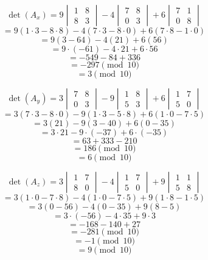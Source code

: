 \documentclass[a4paper]{exam}
\begin{document}
\begin{questions}
\begin{solution}
\begin{parts}
                \[    \det(A_x) = 9 \begin{vmatrix} 1 & 8 \\ 8 & 3 \end{vmatrix} - 4 \begin{vmatrix} 7 & 8 \\ 0 & 3 \end{vmatrix} + 6 \begin{vmatrix} 7 & 1 \\ 0 & 8 \end{vmatrix}\]
                \[    = 9 (1 \cdot 3 - 8 \cdot 8) - 4 (7 \cdot 3 - 8 \cdot 0) + 6 (7 \cdot 8 - 1 \cdot 0)\]
                \[    = 9 (3 - 64) - 4 (21) + 6 (56)\]
                \[    = 9 \cdot (-61) - 4 \cdot 21 + 6 \cdot 56\]
                \[    = -549 - 84 + 336\]
                \[    = -297 \pmod{10}\]
                \[    = 3 \pmod{10}\]

                \[    \det(A_y) = 3 \begin{vmatrix} 7 & 8 \\ 0 & 3 \end{vmatrix} - 9 \begin{vmatrix} 1 & 8 \\ 5 & 3 \end{vmatrix} + 6 \begin{vmatrix} 1 & 7 \\ 5 & 0 \end{vmatrix}\]
                \[    = 3 (7 \cdot 3 - 8 \cdot 0) - 9 (1 \cdot 3 - 5 \cdot 8) + 6 (1 \cdot 0 - 7 \cdot 5)\]
                \[    = 3 (21) - 9 (3 - 40) + 6 (0 - 35)\]
                \[    = 3 \cdot 21 - 9 \cdot (-37) + 6 \cdot (-35)\]
                \[    = 63 + 333 - 210\]
                \[    = 186 \pmod{10}\]
                \[    = 6 \pmod{10}\]

                \[    \det(A_z) = 3 \begin{vmatrix} 1 & 7 \\ 8 & 0 \end{vmatrix} - 4 \begin{vmatrix} 1 & 7 \\ 5 & 0 \end{vmatrix} + 9 \begin{vmatrix} 1 & 1 \\ 5 & 8 \end{vmatrix}\]
                \[    = 3 (1 \cdot 0 - 7 \cdot 8) - 4 (1 \cdot 0 - 7 \cdot 5) + 9 (1 \cdot 8 - 1 \cdot 5)\]
                \[    = 3 (0 - 56) - 4 (0 - 35) + 9 (8 - 5)\]
                \[    = 3 \cdot (-56) - 4 \cdot 35 + 9 \cdot 3\]
                \[    = -168 - 140 + 27\]
                \[    = -281 \pmod{10}\]
                \[    = -1 \pmod{10}\]
                \[    = 9 \pmod{10}\]


\end{parts}
\end{solution}
\end{questions}
\end{document}
